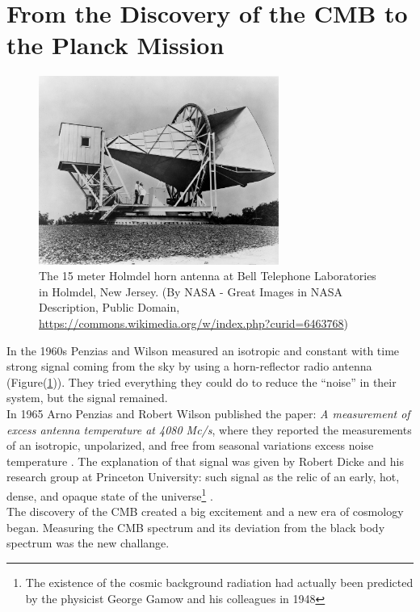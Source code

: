 \documentclass{article}
\begin{document}
\section{From the Discovery of the CMB to the Planck Mission}
%
%
%
\begin{figure}
\begin{center}
\includegraphics[width=0.7\textwidth]{Horn_Antenna.jpeg}
\caption{The 15 meter Holmdel horn antenna at Bell Telephone Laboratories in Holmdel, New Jersey.
(By NASA - Great Images in NASA Description, Public Domain, \url{https://commons.wikimedia.org/w/index.php?curid=6463768})}
\label{antenna}
\end{center}
\end{figure}
%
%
%
In the 1960s Penzias and Wilson measured an isotropic and constant with time strong signal coming from the sky by using a horn-reflector radio antenna (Figure(\ref{antenna})). 
They tried everything they could do to reduce the “noise” in their system, but the signal remained.\\
In 1965 Arno Penzias and Robert Wilson published the paper: \emph{A measurement of excess antenna temperature at
4080 Mc/s}, where they reported the measurements of an isotropic, unpolarized, and free from seasonal variations excess noise temperature
\citep{penziasMeasurementExcessAntenna1965}.
The explanation of that signal was given by Robert Dicke and his research group at Princeton University: such signal as the relic of an early, hot, dense, and opaque state of the universe\footnote{The existence of the cosmic background radiation had actually been predicted by the physicist George Gamow and his colleagues in 1948} \citep{bucherPhysicsCosmicMicrowave2015}
. \\
The discovery of the CMB created a big excitement and a new era of cosmology began.
Measuring the CMB spectrum and its deviation from the black body spectrum was the new challange.
\end{document}
